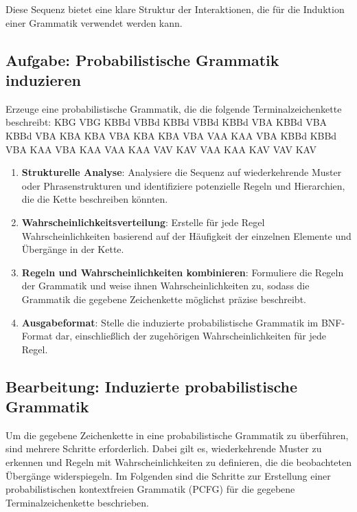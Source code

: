 \documentclass[
]{article}
\begin{document}
Diese Sequenz bietet eine klare Struktur der Interaktionen, die für die Induktion einer Grammatik verwendet werden kann.

\subsection{Aufgabe: Probabilistische Grammatik induzieren}\label{aufgabe-probabilistische-grammatik-induzieren}

Erzeuge eine probabilistische Grammatik, die die folgende Terminalzeichenkette beschreibt: KBG VBG KBBd VBBd KBBd VBBd KBBd VBA KBBd VBA KBBd VBA KBA KBA VBA KBA KBA VBA VAA KAA VBA KBBd KBBd VBA KAA VBA KAA VAA KAA VAV KAV VAA KAA KAV VAV KAV

\begin{enumerate}
\def\labelenumi{\arabic{enumi}.}
\item \textbf{Strukturelle Analyse}: Analysiere die Sequenz auf wiederkehrende Muster oder Phrasenstrukturen und identifiziere potenzielle Regeln und Hierarchien, die die Kette beschreiben könnten.
\item \textbf{Wahrscheinlichkeitsverteilung}: Erstelle für jede Regel Wahrscheinlichkeiten basierend auf der Häufigkeit der einzelnen Elemente und Übergänge in der Kette.
\item \textbf{Regeln und Wahrscheinlichkeiten kombinieren}: Formuliere die Regeln der Grammatik und weise ihnen Wahrscheinlichkeiten zu, sodass die Grammatik die gegebene Zeichenkette möglichst präzise beschreibt.
\item \textbf{Ausgabeformat}: Stelle die induzierte probabilistische Grammatik im BNF-Format dar, einschließlich der zugehörigen Wahrscheinlichkeiten für jede Regel.
\end{enumerate}

\subsection{Bearbeitung: Induzierte probabilistische Grammatik}\label{bearbeitung-induzierte-probabilistische-grammatik}

Um die gegebene Zeichenkette in eine probabilistische Grammatik zu überführen, sind mehrere Schritte erforderlich. Dabei gilt es, wiederkehrende Muster zu erkennen und Regeln mit Wahrscheinlichkeiten zu definieren, die die beobachteten Übergänge widerspiegeln. Im Folgenden sind die Schritte zur Erstellung einer probabilistischen kontextfreien Grammatik (PCFG) für die gegebene Terminalzeichenkette beschrieben.
\end{document}
